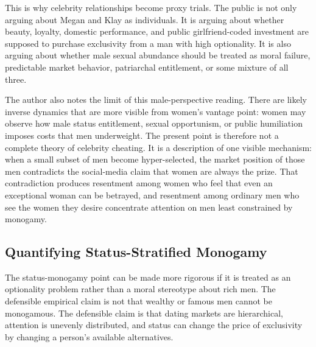 \documentclass[12pt]{article}
\begin{document}
This is why celebrity relationships become proxy trials. The public is not only arguing about Megan and Klay as individuals. It is arguing about whether beauty, loyalty, domestic performance, and public girlfriend-coded investment are supposed to purchase exclusivity from a man with high optionality. It is also arguing about whether male sexual abundance should be treated as moral failure, predictable market behavior, patriarchal entitlement, or some mixture of all three.

The author also notes the limit of this male-perspective reading. There are likely inverse dynamics that are more visible from women's vantage point: women may observe how male status entitlement, sexual opportunism, or public humiliation imposes costs that men underweight. The present point is therefore not a complete theory of celebrity cheating. It is a description of one visible mechanism: when a small subset of men become hyper-selected, the market position of those men contradicts the social-media claim that women are always the prize. That contradiction produces resentment among women who feel that even an exceptional woman can be betrayed, and resentment among ordinary men who see the women they desire concentrate attention on men least constrained by monogamy.

\subsection{Quantifying Status-Stratified Monogamy}

The status-monogamy point can be made more rigorous if it is treated as an optionality problem rather than a moral stereotype about rich men. The defensible empirical claim is not that wealthy or famous men cannot be monogamous. The defensible claim is that dating markets are hierarchical, attention is unevenly distributed, and status can change the price of exclusivity by changing a person's available alternatives.
\end{document}
